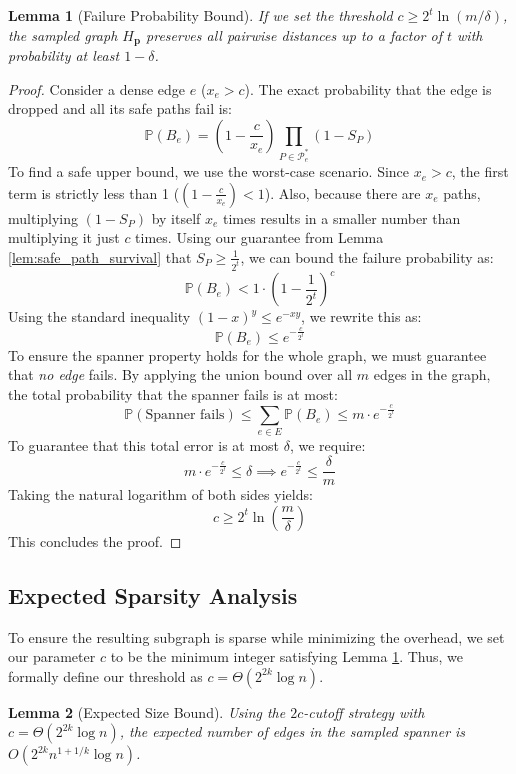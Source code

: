\documentclass[11pt,a4paper]{article}
\newtheorem{lemma}{Lemma}[section]
\begin{document}
\begin{lemma}[Failure Probability Bound]\label{lem:failure_bound}
If we set the threshold $c \ge 2^t \ln(m/\delta)$, the sampled graph $H_{\mathbf p}$ preserves all pairwise distances up to a factor of $t$ with probability at least $1 - \delta$.
\end{lemma}

\begin{proof}
Consider a dense edge $e$ ($x_e > c$). The exact probability that the edge is dropped and all its safe paths fail is:
\[
\mathbb{P}(B_e) = \left( 1 - \frac{c}{x_e} \right) \prod_{P \in \mathcal{P}^*_e} (1 - S_P)
\]
To find a safe upper bound, we use the worst-case scenario. Since $x_e > c$, the first term is strictly less than 1 ($\left( 1 - \frac{c}{x_e} \right) < 1$). Also, because there are $x_e$ paths, multiplying $(1 - S_P)$ by itself $x_e$ times results in a smaller number than multiplying it just $c$ times. Using our guarantee from Lemma \ref{lem:safe_path_survival} that $S_P \ge \frac{1}{2^t}$, we can bound the failure probability as:
\[
\mathbb{P}(B_e) < 1 \cdot \left( 1 - \frac{1}{2^t} \right)^c
\]
Using the standard inequality $(1 - x)^y \le e^{-xy}$, we rewrite this as:
\[
\mathbb{P}(B_e) \le e^{-\frac{c}{2^t}}
\]
To ensure the spanner property holds for the whole graph, we must guarantee that \emph{no edge} fails. By applying the union bound over all $m$ edges in the graph, the total probability that the spanner fails is at most:
\[
\mathbb{P}(\text{Spanner fails}) \le \sum_{e \in E} \mathbb{P}(B_e) \le m \cdot e^{-\frac{c}{2^t}}
\]
To guarantee that this total error is at most $\delta$, we require:
\[
m \cdot e^{-\frac{c}{2^t}} \le \delta \implies e^{-\frac{c}{2^t}} \le \frac{\delta}{m}
\]
Taking the natural logarithm of both sides yields:
\[
c \ge 2^t \ln\left(\frac{m}{\delta}\right)
\]
This concludes the proof.
\end{proof}

\subsection{Expected Sparsity Analysis}
To ensure the resulting subgraph is sparse while minimizing the overhead, we set our parameter $c$ to be the minimum integer satisfying Lemma \ref{lem:failure_bound}. Thus, we formally define our threshold as $c = \Theta(2^{2k} \log n)$.



\begin{lemma}[Expected Size Bound]\label{lem:expected_size}
Using the $2c$-cutoff strategy with $c = \Theta(2^{2k} \log n)$, the expected number of edges in the sampled spanner is $O(2^{2k} n^{1+1/k} \log n)$.
\end{lemma}
\end{document}
